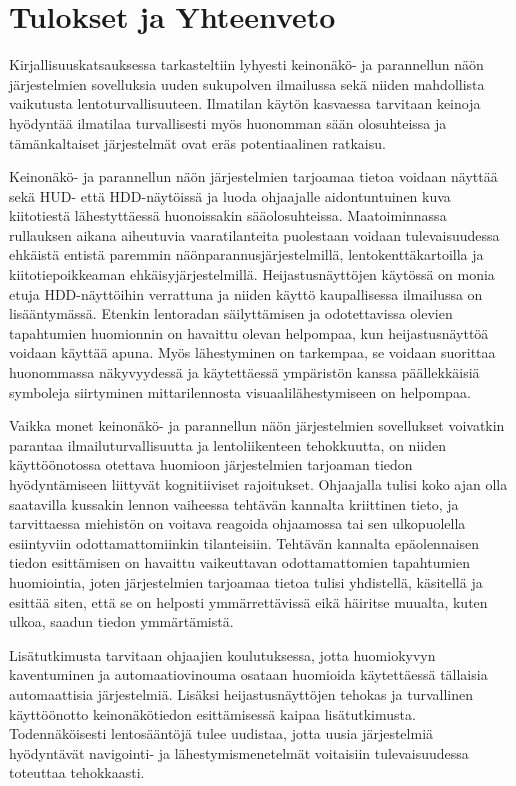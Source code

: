 \documentclass[utf8,bachelor,manualbib]{gradu3}
\begin{document}
\chapter{Tulokset ja Yhteenveto}

Kirjallisuuskatsauksessa tarkasteltiin lyhyesti keinonäkö- ja parannellun näön järjestelmien sovelluksia uuden sukupolven ilmailussa sekä niiden mahdollista vaikutusta lentoturvallisuuteen. Ilmatilan käytön kasvaessa tarvitaan keinoja hyödyntää ilmatilaa turvallisesti myös huonomman sään olosuhteissa ja tämänkaltaiset järjestelmät ovat eräs potentiaalinen ratkaisu.

Keinonäkö- ja parannellun näön järjestelmien tarjoamaa tietoa voidaan näyttää sekä HUD- että HDD-näytöissä ja luoda ohjaajalle aidontuntuinen kuva kiitotiestä lähestyttäessä huonoissakin sääolosuhteissa. Maatoiminnassa rullauksen aikana aiheutuvia vaaratilanteita puolestaan voidaan tulevaisuudessa ehkäistä entistä paremmin näönparannusjärjestelmillä, lentokenttäkartoilla ja kiitotiepoikkeaman ehkäisyjärjestelmillä. Heijastusnäyttöjen käytössä on monia etuja HDD-näyttöihin verrattuna ja niiden käyttö kaupallisessa ilmailussa on lisääntymässä. Etenkin lentoradan säilyttämisen ja odotettavissa olevien tapahtumien huomionnin on havaittu olevan helpompaa, kun heijastusnäyttöä voidaan käyttää apuna. Myös lähestyminen on tarkempaa, se voidaan suorittaa huonommassa näkyvyydessä ja käytettäessä ympäristön kanssa päällekkäisiä symboleja siirtyminen mittarilennosta visuaalilähestymiseen on helpompaa. 

Vaikka monet keinonäkö- ja parannellun näön järjestelmien sovellukset voivatkin parantaa ilmailuturvallisuutta ja lentoliikenteen tehokkuutta, on niiden käyttöönotossa otettava huomioon järjestelmien tarjoaman tiedon hyödyntämiseen liittyvät kognitiiviset rajoitukset. Ohjaajalla tulisi koko ajan olla saatavilla kussakin lennon vaiheessa tehtävän kannalta kriittinen tieto, ja tarvittaessa miehistön on voitava reagoida ohjaamossa tai sen ulkopuolella esiintyviin odottamattomiinkin tilanteisiin. Tehtävän kannalta epäolennaisen tiedon esittämisen on havaittu vaikeuttavan odottamattomien tapahtumien huomiointia, joten järjestelmien tarjoamaa tietoa tulisi yhdistellä, käsitellä ja esittää siten, että se on helposti ymmärrettävissä eikä häiritse muualta, kuten ulkoa, saadun tiedon ymmärtämistä.

Lisätutkimusta tarvitaan ohjaajien koulutuksessa, jotta huomiokyvyn kaventuminen ja automaatiovinouma osataan huomioida käytettäessä tällaisia automaattisia järjestelmiä. Lisäksi heijastusnäyttöjen tehokas ja turvallinen käyttöönotto keinonäkötiedon esittämisessä kaipaa lisätutkimusta. Todennäköisesti lentosääntöjä tulee uudistaa, jotta uusia järjestelmiä hyödyntävät navigointi- ja lähestymismenetelmät voitaisiin tulevaisuudessa toteuttaa tehokkaasti.
\end{document}
